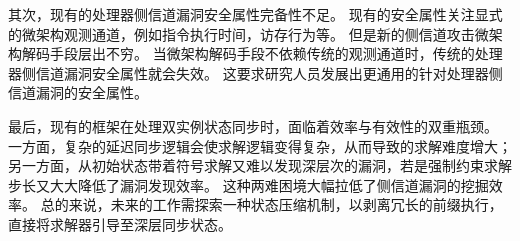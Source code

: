 其次，现有的处理器侧信道漏洞安全属性完备性不足。
现有的安全属性关注显式的微架构观测通道，例如指令执行时间，访存行为等。
但是新的侧信道攻击微架构解码手段层出不穷。
当微架构解码手段不依赖传统的观测通道时，传统的处理器侧信道漏洞安全属性就会失效。
这要求研究人员发展出更通用的针对处理器侧信道漏洞的安全属性。

最后，现有的框架在处理双实例状态同步时，面临着效率与有效性的双重瓶颈。
一方面，复杂的延迟同步逻辑会使求解逻辑变得复杂，从而导致的求解难度增大；
另一方面，从初始状态带着符号求解又难以发现深层次的漏洞，若是强制约束求解步长又大大降低了漏洞发现效率。
这种两难困境大幅拉低了侧信道漏洞的挖掘效率。
总的来说，未来的工作需探索一种状态压缩机制，以剥离冗长的前缀执行，直接将求解器引导至深层同步状态。

\newpage
\begingroup
    \printbibliography[title={参考文献}]
\endgroup
